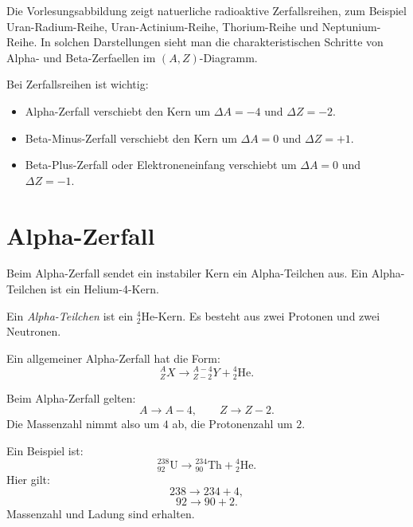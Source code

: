 \begin{notebox}
Die Vorlesungsabbildung zeigt natuerliche radioaktive Zerfallsreihen, zum Beispiel
Uran-Radium-Reihe, Uran-Actinium-Reihe, Thorium-Reihe und Neptunium-Reihe.
In solchen Darstellungen sieht man die charakteristischen Schritte von Alpha- und
Beta-Zerfaellen im $(A,Z)$-Diagramm.
\end{notebox}

\begin{examtipbox}
Bei Zerfallsreihen ist wichtig:
\begin{itemize}
    \item Alpha-Zerfall verschiebt den Kern um $\Delta A=-4$ und $\Delta Z=-2$.
    \item Beta-Minus-Zerfall verschiebt den Kern um $\Delta A=0$ und $\Delta Z=+1$.
    \item Beta-Plus-Zerfall oder Elektroneneinfang verschiebt um $\Delta A=0$ und $\Delta Z=-1$.
\end{itemize}
\end{examtipbox}

\section{Alpha-Zerfall}

Beim Alpha-Zerfall sendet ein instabiler Kern ein Alpha-Teilchen aus.
Ein Alpha-Teilchen ist ein Helium-4-Kern.

\begin{definitionbox}
Ein \emph{Alpha-Teilchen} ist ein ${}^{4}_{2}\mathrm{He}$-Kern.
Es besteht aus zwei Protonen und zwei Neutronen.
\end{definitionbox}

\begin{formulabox}
Ein allgemeiner Alpha-Zerfall hat die Form:
\[
    {}^{A}_{Z}X
    \rightarrow
    {}^{A-4}_{Z-2}Y
    +
    {}^{4}_{2}\mathrm{He}.
\]
\end{formulabox}

\begin{conceptbox}
Beim Alpha-Zerfall gelten:
\[
    A \rightarrow A-4,
    \qquad
    Z \rightarrow Z-2.
\]
Die Massenzahl nimmt also um $4$ ab, die Protonenzahl um $2$.
\end{conceptbox}

\begin{examplebox}
Ein Beispiel ist:
\[
    {}^{238}_{92}\mathrm{U}
    \rightarrow
    {}^{234}_{90}\mathrm{Th}
    +
    {}^{4}_{2}\mathrm{He}.
\]
Hier gilt:
\[
    238 \rightarrow 234+4,
\]
\[
    92 \rightarrow 90+2.
\]
Massenzahl und Ladung sind erhalten.
\end{examplebox}

